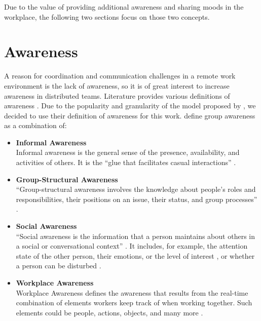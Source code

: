 Due to the value of providing additional awareness and sharing moods in the workplace, the following two sections focus on those two concepts.

\section{Awareness}
\label{section:awareness}
A reason for coordination and communication challenges in a remote work environment is the lack of awareness, so it is of great interest to increase awareness in distributed teams. Literature provides various definitions of awareness \autocite{chang2007out, gross2013supporting, gross2005user}. Due to the popularity and granularity of the model proposed by \textcite{gutwin1996workspace}, we decided to use their definition of awareness for this work. \textcite{gutwin1996workspace} define group awareness as a combination of:


\begin{itemize}[itemsep=0ex, parsep=0ex, leftmargin=*]
    \item \textbf{Informal Awareness} \\
          Informal awareness is the general sense of the presence, availability, and activities of others. It is the \enquote{glue that facilitates casual interactions} \autocite[p.~6]{gutwin1996workspace}.
    \item \textbf{Group-Structural Awareness} \\
          \enquote{Group-structural awareness involves the knowledge about people’s roles and responsibilities, their positions on an issue, their status, and group processes} \autocite[p.~6]{gutwin1996workspace}.
    \item \textbf{Social Awareness} \\
          \enquote{Social awareness is the information that a person maintains about others in a social or conversational context} \autocite{gutwin1996workspace}. It includes, for example, the attention state of the other person, their emotions, or the level of interest \autocite[p.~6]{gutwin1996workspace}, or whether a person can be disturbed \autocite{gutwin1995support}.
    \item \textbf{Workplace Awareness} \\
          Workplace Awareness defines the awareness that results from the real-time combination of elements workers keep track of when working together. Such elements could be people, actions, objects, and many more \autocite{gutwin1995support}.
\end{itemize}

